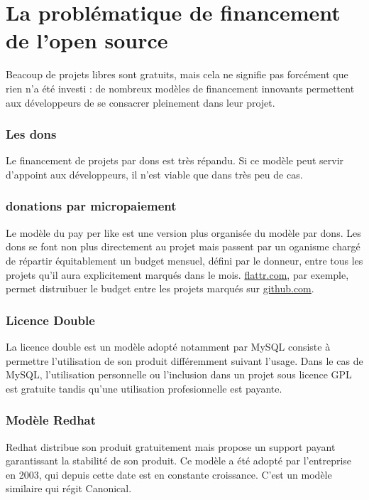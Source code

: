 \chapter{La problématique de financement de l'open source}

Beacoup de projets libres sont gratuits, mais cela ne signifie pas forcément que
rien n'a été investi : de nombreux modèles de financement innovants permettent
aux développeurs de se consacrer pleinement dans leur projet.

    \subsection{Les dons}

Le financement de projets par dons est très répandu.
Si ce modèle peut servir d'appoint aux développeurs, il n'est viable que dans
très peu de cas.
    
    \subsection{donations par micropaiement}

Le modèle du pay per like est une version plus organisée du modèle par dons. Les
dons se font non plus directement au projet mais passent par un oganisme chargé
de répartir équitablement un budget mensuel, défini par le donneur, entre tous
les projets qu'il aura explicitement marqués dans le mois.
\url{flattr.com}, par exemple, permet distruibuer le budget entre les projets
marqués sur \url{github.com}.

    \subsection{Licence Double}

La licence double est un modèle adopté notamment par MySQL consiste à permettre
l'utilisation de son produit différemment suivant l'usage. Dans le cas de MySQL,
l'utilisation personnelle ou l'inclusion dans un projet sous licence GPL est
gratuite tandis qu'une utilisation profesionnelle est payante.

    \subsection{Modèle Redhat}

Redhat distribue son produit gratuitement mais propose un support payant
garantissant la stabilité de son produit. Ce modèle a été adopté par
l'entreprise en 2003, qui depuis cette date est en constante croissance.
C'est un modèle similaire qui régit Canonical.

